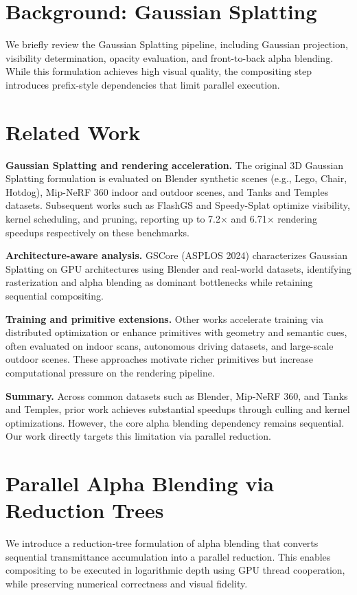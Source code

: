 \documentclass[10pt,twocolumn]{article}
\begin{document}
\section{Background: Gaussian Splatting}
We briefly review the Gaussian Splatting pipeline, including Gaussian projection, visibility determination, opacity evaluation, and front-to-back alpha blending. While this formulation achieves high visual quality, the compositing step introduces prefix-style dependencies that limit parallel execution.

\section{Related Work}
\textbf{Gaussian Splatting and rendering acceleration.}
The original 3D Gaussian Splatting formulation is evaluated on Blender synthetic scenes (e.g., Lego, Chair, Hotdog), Mip-NeRF 360 indoor and outdoor scenes, and Tanks and Temples datasets. Subsequent works such as FlashGS and Speedy-Splat optimize visibility, kernel scheduling, and pruning, reporting up to 7.2$\times$ and 6.71$\times$ rendering speedups respectively on these benchmarks.

\textbf{Architecture-aware analysis.}
GSCore (ASPLOS 2024) characterizes Gaussian Splatting on GPU architectures using Blender and real-world datasets, identifying rasterization and alpha blending as dominant bottlenecks while retaining sequential compositing.

\textbf{Training and primitive extensions.}
Other works accelerate training via distributed optimization or enhance primitives with geometry and semantic cues, often evaluated on indoor scans, autonomous driving datasets, and large-scale outdoor scenes. These approaches motivate richer primitives but increase computational pressure on the rendering pipeline.

\textbf{Summary.}
Across common datasets such as Blender, Mip-NeRF 360, and Tanks and Temples, prior work achieves substantial speedups through culling and kernel optimizations. However, the core alpha blending dependency remains sequential. Our work directly targets this limitation via parallel reduction.

\section{Parallel Alpha Blending via Reduction Trees}
We introduce a reduction-tree formulation of alpha blending that converts sequential transmittance accumulation into a parallel reduction. This enables compositing to be executed in logarithmic depth using GPU thread cooperation, while preserving numerical correctness and visual fidelity.
\end{document}
